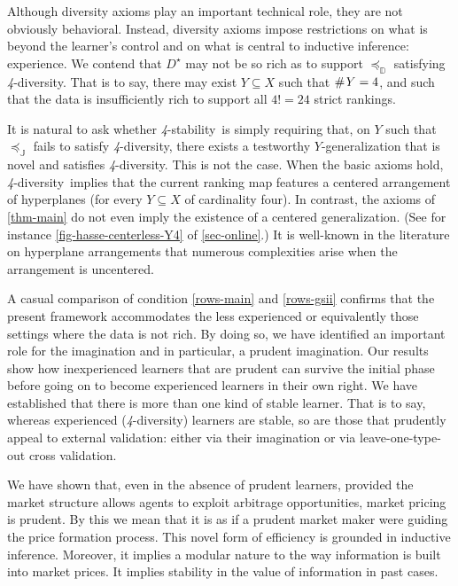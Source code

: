 \documentclass[12pt,a4paper,twoside]{article}
\newcommand{\preceqb}{\mathbin{\preceq}}
\newcommand{\countof}{\mathbin{\#}\hskip1pt}
\newcommand{\mbbd}{{\mathds D}}
\newcommand{\mbbj}{\mathds J}
\newcommand{\past}{{D^\star}}
\newcommand{\stability}{\textit{4}-\textup{{stability}}}
\newcommand{\fourdiv}{\textit{4}-\textup{diversity}}
\begin{document}
Although diversity axioms play an important technical role, they are not
obviously behavioral. Instead, diversity axioms impose restrictions on what is
beyond the learner's control and on what is central to inductive inference:
experience. We contend that $\past$ may not be so rich as to support
$\preceqb_{\mbbd}$ satisfying \fourdiv. That is to say, there may exist $Y
\subseteq X$ such that $\countof Y = 4$, and such that the data is
insufficiently rich to support all $4 ! = 24$ strict rankings.

It is natural to ask whether \stability\ is simply requiring that, on $Y$ such
that $\preceq_{\mbbj}$ fails to satisfy \fourdiv, there exists a testworthy
$Y$-{generalization} that is novel and satisfies \fourdiv.  This is not the
case.  When the basic axioms hold, \fourdiv\ implies that the current ranking
map features a centered arrangement of hyperplanes (for every $Y\subseteq X$ of
cardinality four). In contrast, the axioms of \cref{thm-main} do not even imply
the existence of a centered generalization.  (See for instance
\cref{fig-hasse-centerless-Y4} of \cref{sec-online}.) It is well-known in the
literature on hyperplane arrangements that numerous complexities arise when the
arrangement is uncentered.

A casual comparison of condition \ref{rows-main} and \ref{rows-gsii} confirms
that the present framework accommodates the less experienced or equivalently
those settings where the data is not rich.  By doing so, we have identified an
important role for the imagination and in particular, a prudent imagination.
Our results show how inexperienced learners that are prudent can survive the
initial phase before going on to become experienced learners in their own
right. We have established that there is more than one kind of stable learner.
That is to say, whereas experienced (\fourdiv) learners are stable, so are
those that prudently appeal to external validation: either via their
imagination or via leave-one-type-out cross validation.

We have shown that, even in the absence of prudent learners, provided the
market structure allows agents to exploit arbitrage opportunities, market
pricing is prudent. By this we mean that it is as if a prudent market maker
were guiding the price formation process. This novel form of efficiency is
grounded in inductive inference. Moreover, it implies a modular nature to the
way information is built into market prices. It implies stability in the
value of information in past cases. 
\end{document}
